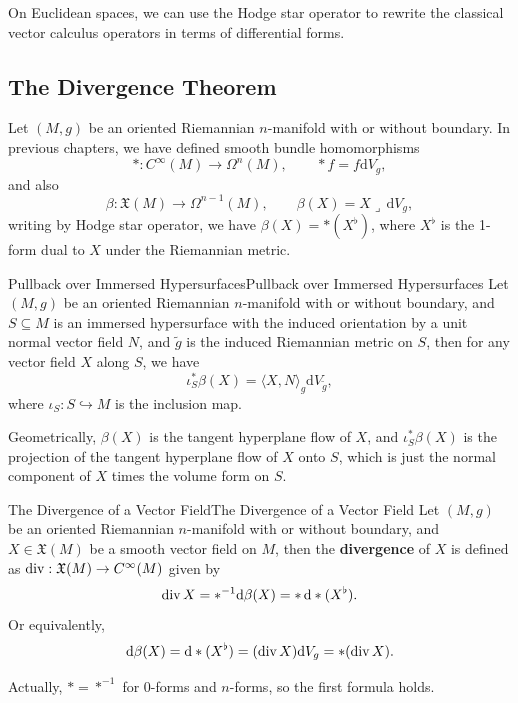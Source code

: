\documentclass[../main.tex]{subfiles}
\begin{document}
On Euclidean spaces, we can use the Hodge star operator to rewrite the classical vector calculus operators in terms of differential forms.

\subsection{The Divergence Theorem}
Let $(M,g)$ be an oriented Riemannian $n$-manifold with or without boundary. In previous chapters, we have defined smooth bundle homomorphisms
\begin{equation*}
  *: C^\infty (M) \to \Omega^n(M), \qquad *f = f \mathrm{d} V_g,
\end{equation*}
and also
\begin{equation*}
  \beta: \mathfrak{X}(M) \to \Omega^{n-1}(M), \qquad \beta(X) = X \lrcorner \, \mathrm{d} V_g,
\end{equation*}
writing by Hodge star operator, we have $\beta(X) = * (X^\flat)$, where $X^\flat$ is the 1-form dual to $X$ under the Riemannian metric.

\begin{lemma}{Pullback over Immersed Hypersurfaces}{Pullback over Immersed Hypersurfaces}
  Let $(M,g)$ be an oriented Riemannian $n$-manifold with or without boundary, and $S \subseteq M$ is an immersed hypersurface with the induced orientation by a unit normal vector field $N$, and $\tilde{g}$ is the induced Riemannian metric on $S$, then for any vector field $X$ along $S$, we have
  \begin{equation}
    \iota_S^* \beta(X) = \langle X, N \rangle_g \mathrm{d} V_{\tilde{g}},
  \end{equation}
  where $\iota_S: S \hookrightarrow M$ is the inclusion map.
\end{lemma}
Geometrically, $\beta(X)$ is the tangent hyperplane flow of $X$, and $\iota_S^* \beta(X)$ is the projection of the tangent hyperplane flow of $X$ onto $S$, which is just the normal component of $X$ times the volume form on $S$.

\begin{definition}{The Divergence of a Vector Field}{The Divergence of a Vector Field}
  Let $(M,g)$ be an oriented Riemannian $n$-manifold with or without boundary, and $X \in \mathfrak{X}(M)$ be a smooth vector field on $M$, then the \textbf{divergence} of $X$ is defined as $\operatorname{div}: \mathfrak{X}(M) \to C^\infty (M)$ given by
  \begin{equation}
    \operatorname{div} X = *^{-1} \mathrm{d} \beta(X) = * \, \mathrm{d} * (X^\flat).
  \end{equation}
  Or equivalently,
  \begin{equation}
    \mathrm{d} \beta(X) = \mathrm{d} * (X^\flat) = (\operatorname{div} X) \mathrm{d} V_g = * (\operatorname{div} X).
  \end{equation}
\end{definition}
Actually, $*=*^{-1}$ for 0-forms and $n$-forms, so the first formula holds.
\end{document}
